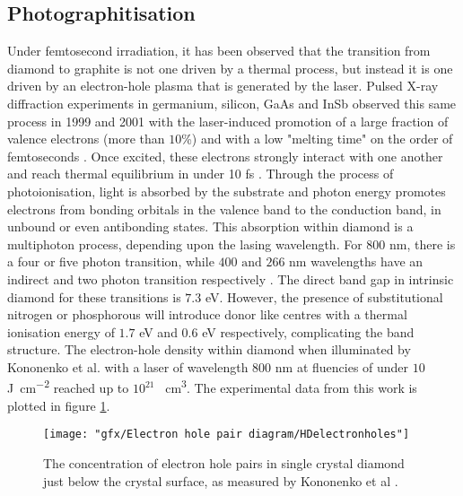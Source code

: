 \subsection{Photographitisation}
Under femtosecond irradiation, it has been observed that the transition from diamond to graphite is not one driven by a thermal process, but instead it is one driven by an electron-hole plasma that is generated by the laser. Pulsed X-ray diffraction experiments in germanium, silicon, GaAs and InSb observed this same process in 1999 and 2001 with the laser-induced promotion of a large fraction of valence electrons (more than $10$\%) and with a low "melting time" on the order of femtoseconds \cite{siders:1999,rousse:2001}. Once excited, these electrons strongly interact with one another and reach thermal equilibrium in under 10 \si{\femto\second} \cite{elsaesser:1991}.
Through the process of photoionisation, light is absorbed by the substrate and photon energy promotes electrons from bonding orbitals in the valence band to the conduction band, in unbound or even antibonding states. This absorption within diamond is a multiphoton process, depending upon the lasing wavelength. For $800$ \si{\nano\metre}, there is a four or five photon transition, while $400\text{ and }266$ \si{\nano\metre} wavelengths have an indirect and two photon transition respectively \cite{preuss:1995}. The direct band gap in intrinsic diamond for these transitions is $7.3$ \si{\electronvolt}. However, the presence of substitutional nitrogen or phosphorous will introduce donor like centres with a thermal ionisation energy of $1.7$ \si{\electronvolt} and $0.6$ \si{\electronvolt} respectively, complicating the band structure. The electron-hole density within diamond when illuminated by Kononenko et al. with a  laser of wavelength $800$ \si{\nano\metre} at fluencies of under $10$ \si{\joule\per\centi\metre\squared} reached up to $10^{21}$ \si{\per\centi\metre\cubed}. The experimental data from this work is plotted in figure \ref{fig:electronholes}.

\begin{figure}
	\centering
	\texttt{[image: "gfx/Electron hole pair diagram/HDelectronholes"]}
	\caption{The concentration of electron hole pairs in single crystal diamond just below the crystal surface, as measured by Kononenko et al \cite{kononenko:2014}.}
	\label{fig:electronholes}
\end{figure}

